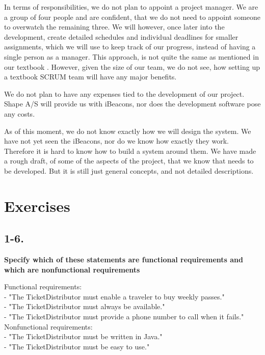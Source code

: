\documentclass[12pt]{article}
\begin{document}
In terms of responsibilities, we do not plan to appoint a project manager. We are a group of four people and are confident, that we do not need to appoint someone to overwatch the remaining three. We will however, once later into the development, create detailed schedules and individual deadlines for smaller assignments, which we will use to keep track of our progress, instead of having a single person as a manager. This approach, is not quite the same as mentioned in our textbook \cite{OOSE}. However, given the size of our team, we do not see, how setting up a textbook SCRUM team will have any major benefits.

We do not plan to have any expenses tied to the development of our project. Shape A/S will provide us with iBeacons, nor does the development software pose any costs.

As of this moment, we do not know exactly how we will design the system. We have not yet seen the iBeacons, nor do we know how exactly they work. Therefore it is hard to know how to build a system around them. We have made a rough draft, of some of the aspects of the project, that we know that needs to be developed. But it is still just general concepts, and not detailed descriptions.










\newpage
\section{Exercises}
\subsection{1-6.}
\textbf{Specify which of these statements are functional requirements and which are
nonfunctional requirements}

Functional requirements:\\
- "The TicketDistributor must enable a traveler to buy weekly passes."\\
- "The TicketDistributor must always be available."\\
- "The TicketDistributor must provide a phone number to call when it fails."\\

Nonfunctional requirements:\\
- "The TicketDistributor must be written in Java."\\
- "The TicketDistributor must be easy to use."\\
\end{document}
